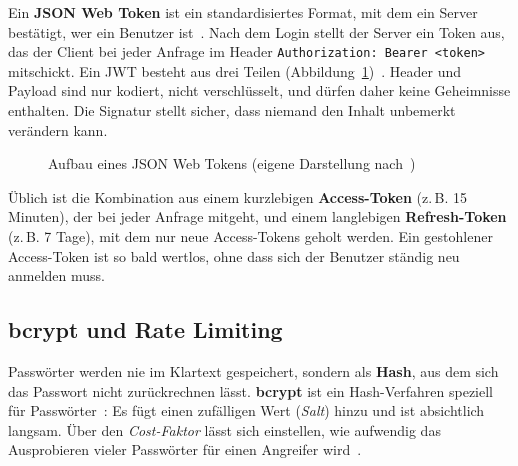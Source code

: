 Ein \textbf{JSON Web Token} ist ein standardisiertes Format, mit dem ein Server bestätigt, wer ein Benutzer ist~\cite{rfc7519}. Nach dem Login stellt der Server ein Token aus, das der Client bei jeder Anfrage im Header \texttt{Authorization: Bearer <token>} mitschickt. Ein JWT besteht aus drei Teilen (Abbildung~\ref{fig:jwt})~\cite{jwt-io}. Header und Payload sind nur kodiert, nicht verschlüsselt, und dürfen daher keine Geheimnisse enthalten. Die Signatur stellt sicher, dass niemand den Inhalt unbemerkt verändern kann.

\begin{figure}[htbp]
  \centering
  \caption[Aufbau eines JWT]{Aufbau eines JSON Web Tokens (eigene Darstellung nach~\cite{jwt-io})}
  \label{fig:jwt}
\end{figure}

Üblich ist die Kombination aus einem kurzlebigen \textbf{Access-Token} (z.\,B. 15 Minuten), der bei jeder Anfrage mitgeht, und einem langlebigen \textbf{Refresh-Token} (z.\,B. 7 Tage), mit dem nur neue Access-Tokens geholt werden. Ein gestohlener Access-Token ist so bald wertlos, ohne dass sich der Benutzer ständig neu anmelden muss.

\subsection{bcrypt und Rate Limiting}
\label{sec:bcrypt}
\label{sec:throttler}

Passwörter werden nie im Klartext gespeichert, sondern als \textbf{Hash}, aus dem sich das Passwort nicht zurückrechnen lässt. \textbf{bcrypt} ist ein Hash-Verfahren speziell für Passwörter~\cite{bcrypt-npm}: Es fügt einen zufälligen Wert (\emph{Salt}) hinzu und ist absichtlich langsam. Über den \emph{Cost-Faktor} lässt sich einstellen, wie aufwendig das Ausprobieren vieler Passwörter für einen Angreifer wird~\cite{owasp-password}.

